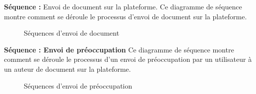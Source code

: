 \textbf{Séquence :} Envoi de document sur la plateforme.
Ce diagramme de séquence montre comment se déroule le processus d'envoi de document sur la plateforme.
\begin{figure}[H]%
    \center%
    \setlength{\fboxsep}{5pt}%
    \setlength{\fboxrule}{0.5pt}%
    \caption{Séquences d'envoi de document}%
\end{figure}
\par
\textbf{Séquence : Envoi de préoccupation}
Ce diagramme de séquence montre comment se déroule le processus d'un envoi de préoccupation par un utilisateur à un auteur de document sur la plateforme.

\begin{figure}[H]%
    \center%
    \setlength{\fboxsep}{5pt}%
    \setlength{\fboxrule}{0.5pt}%
    \caption{Séquences d'envoi de préoccupation}%
\end{figure}

